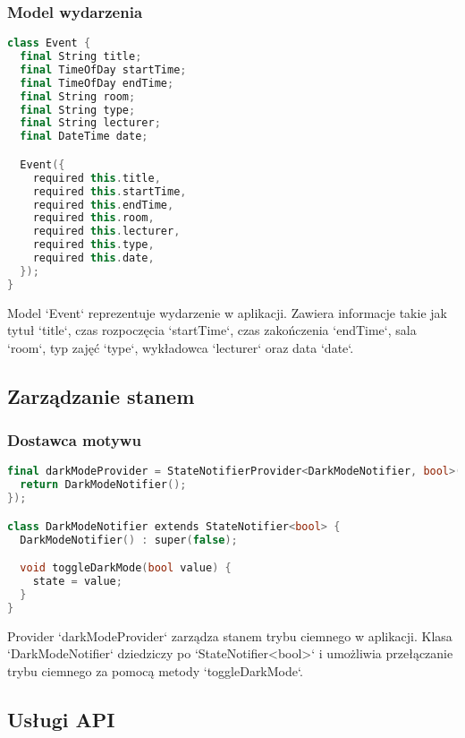 \subsubsection{Model wydarzenia}
\begin{lstlisting}[language=C++, caption=Model wydarzenia, label={lst:event-model}]
class Event {
  final String title;
  final TimeOfDay startTime;
  final TimeOfDay endTime;
  final String room;
  final String type;
  final String lecturer;
  final DateTime date;

  Event({
    required this.title,
    required this.startTime,
    required this.endTime,
    required this.room,
    required this.lecturer,
    required this.type,
    required this.date,
  });
}
\end{lstlisting}
Model `Event` reprezentuje wydarzenie w aplikacji. Zawiera informacje takie jak tytuł `title`, czas rozpoczęcia `startTime`, czas zakończenia `endTime`, sala `room`, typ zajęć `type`, wykładowca `lecturer` oraz data `date`.

\subsection{Zarządzanie stanem}

\subsubsection{Dostawca motywu}
\begin{lstlisting}[language=C++, caption=Provider motywu, label={lst:theme-provider}]
final darkModeProvider = StateNotifierProvider<DarkModeNotifier, bool>((ref) {
  return DarkModeNotifier();
});

class DarkModeNotifier extends StateNotifier<bool> {
  DarkModeNotifier() : super(false);

  void toggleDarkMode(bool value) {
    state = value;
  }
}
\end{lstlisting}
Provider `darkModeProvider` zarządza stanem trybu ciemnego w aplikacji. Klasa `DarkModeNotifier` dziedziczy po `StateNotifier<bool>` i umożliwia przełączanie trybu ciemnego za pomocą metody `toggleDarkMode`.

\subsection{Usługi API}

